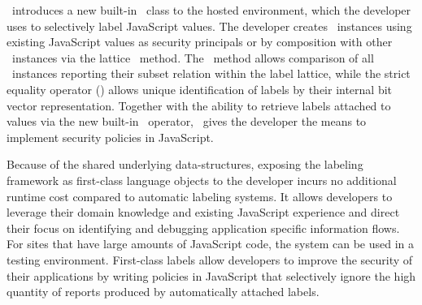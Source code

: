 \JitFlow\ introduces a new built-in \FlowLabelObject\ class to the hosted environment, which the developer uses to selectively label JavaScript values.
The developer creates \FlowLabelObject\ instances using existing JavaScript values as security principals or by composition with other \FlowLabelObject\ instances via the lattice \join\ method.
The \msubsumes\ method allows comparison of all \FlowLabelObject\ instances reporting their subset relation within the label lattice, while the strict equality operator (\code{===}) allows unique identification of labels by their internal bit vector representation.
Together with the ability to retrieve labels attached to values via the new built-in \mlabelof\ operator, \JitFlow\ gives the developer the means to implement security policies in JavaScript.

Because of the shared underlying data-structures, exposing the labeling framework as first-class language objects to the developer incurs no additional runtime cost compared to automatic labeling systems.
It allows developers to leverage their domain knowledge and existing JavaScript experience and direct their focus on identifying and debugging application specific information flows.
For sites that have large amounts of JavaScript code, the system can be used in a testing environment.
First-class labels allow developers to improve the security of their applications by writing policies in JavaScript that selectively ignore the high quantity of reports produced by automatically attached labels.

